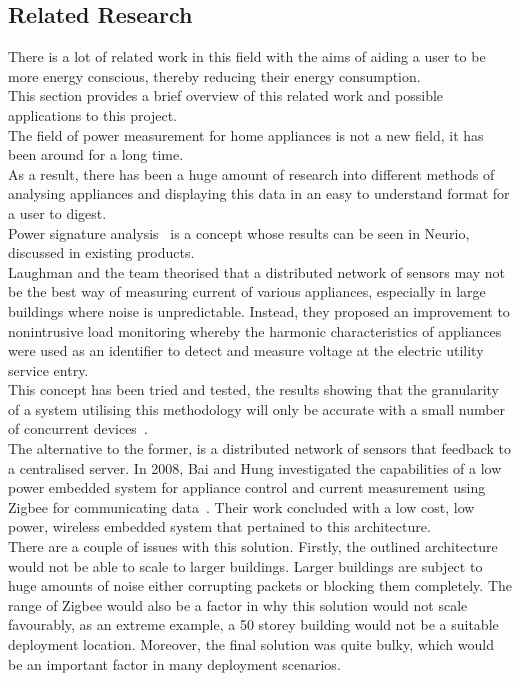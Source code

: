 \documentclass[preprint,12pt,3p]{elsarticle}
\begin{document}
\subsection{Related Research}
There is a lot of related work in this field with the aims of aiding a user to be more energy conscious, thereby reducing their energy consumption.\\
This section provides a brief overview of this related work and possible applications to this project.\\[5pt]
The field of power measurement for home appliances is not a new field, it has been around for a long time.\\ As a result, there has been a huge amount of research into different methods of analysing appliances and displaying this data in an easy to understand format for a user to digest.\\
Power signature analysis~\cite{laughman2003power} is a concept whose results can be seen in Neurio, discussed in existing products.\\ 
Laughman and the team theorised that a distributed network of sensors may not be the best way of measuring current of various appliances, especially in large buildings where noise is unpredictable. Instead, they proposed an improvement to nonintrusive load monitoring whereby the harmonic characteristics of appliances were used as an identifier to detect and measure voltage at the electric utility service entry.\\
This concept has been tried and tested, the results showing that the granularity of a system utilising this methodology will only be accurate with a small number of concurrent devices~\cite{liang2010load}.\\
The alternative to the former, is a distributed network of sensors that feedback to a centralised server. In 2008, Bai and Hung investigated the capabilities of a low power embedded system for appliance control and current measurement using Zigbee for communicating data~\cite{bai2008remote}. Their work concluded with a low cost, low power, wireless embedded system that pertained to this architecture.\\
There are a couple of issues with this solution. Firstly, the outlined architecture would not be able to scale to larger buildings. Larger buildings are subject to huge amounts of noise either corrupting packets or blocking them completely. The range of Zigbee would also be a factor in why this solution would not scale favourably, as an extreme example, a 50 storey building would not be a suitable deployment location. Moreover, the final solution was quite bulky, which would be an important factor in many deployment scenarios.\\ 
\end{document}
